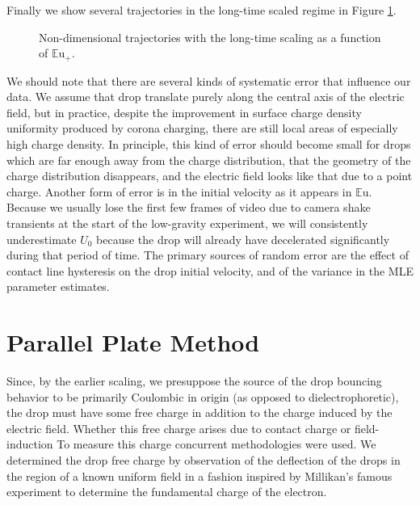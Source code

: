 \documentclass[12pt,a4paper,oneside]{book}
\begin{document}
Finally we show several trajectories in the long-time scaled regime in Figure \ref{fig:series_l_ds}.
\begin{figure}[htb]
    \centering
    
    \caption{Non-dimensional trajectories with the long-time scaling as a function of ${\mathbb{E}\mbox{u}}_+$.\label{fig:series_l_ds}}
\end{figure}
We should note that there are several kinds of systematic error that influence our data. We assume that drop translate purely along the central axis of the electric field, but in practice, despite the improvement in surface charge density uniformity produced by corona charging, there are still local areas of especially high charge density. In principle, this kind of error should become small for drops which are far enough away from the charge distribution, that the geometry of the charge distribution disappears, and the electric field looks like that due to a point charge. Another form of error is in the initial velocity as it appears in $\mathbb{E}\mbox{u}$. Because we usually lose the first few frames of video due to camera shake transients at the start of the low-gravity experiment, we will consistently underestimate $U_0$ because the drop will already have decelerated significantly during that period of time. The primary sources of random error are the effect of contact line hysteresis on the drop initial velocity, and of the variance in the MLE parameter estimates.


\appendix
\appendixpage
\noappendicestocpagenum
\addappheadtotoc

\chapter{Parallel Plate Method}
\label{sec.drop_charge}
Since, by the earlier scaling, we presuppose the source of the drop bouncing behavior to be primarily Coulombic in origin (as opposed to dielectrophoretic), the drop must have some free charge in addition to the charge induced by the electric field. Whether this free charge arises due to contact charge or field-induction To measure this charge concurrent methodologies were used. We determined the drop free charge by observation of the deflection of the drops in the region of a known uniform field in a fashion inspired by Millikan's famous experiment to determine the fundamental charge of the electron.
\end{document}
